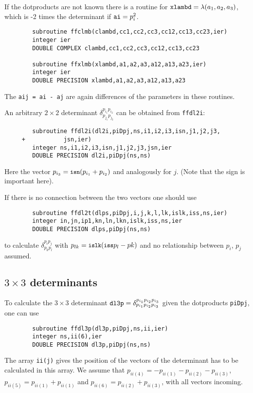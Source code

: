 If the dotproducts are not known there is a routine for $\mbox{\tt 
xlambd} = \lambda(a_1,a_2,a_3)$, which is -2 times the determinant if 
$\mbox{\tt ai} = p_i^2$.
\begin{verbatim}
        subroutine ffclmb(clambd,cc1,cc2,cc3,cc12,cc13,cc23,ier)
        integer ier
        DOUBLE COMPLEX clambd,cc1,cc2,cc3,cc12,cc13,cc23

        subroutine ffxlmb(xlambd,a1,a2,a3,a12,a13,a23,ier)
        integer ier
        DOUBLE PRECISION xlambd,a1,a2,a3,a12,a13,a23
\end{verbatim}
The {\tt aij = ai - aj} are again differences of the parameters in these 
routines.

An arbitrary $2\times2$ determinant $\delta^{p_{i_1} p_{i_2}}_{p_{j_1} 
p_{j_2}}$ can be obtained from {\tt ffdl2i}:
\begin{verbatim}
        subroutine ffdl2i(dl2i,piDpj,ns,i1,i2,i3,isn,j1,j2,j3,
     +           jsn,ier)
        integer ns,i1,i2,i3,isn,j1,j2,j3,jsn,ier
        DOUBLE PRECISION dl2i,piDpj(ns,ns)
\end{verbatim}
Here the vector $p_{i_3} = \mbox{\small\tt isn}(p_{i_1} + p_{i_2})$ and 
analogously for $j$.  (Note that the sign is important here).

If there is no connection between the two vectors one should use
\begin{verbatim}
        subroutine ffdl2t(dlps,piDpj,i,j,k,l,lk,islk,iss,ns,ier)
        integer in,jn,ip1,kn,ln,lkn,islk,iss,ns,ier
        DOUBLE PRECISION dlps,piDpj(ns,ns)
\end{verbatim}
to calculate $\delta^{p_i p_j}_{p_k p_l}$ with $p_{lk} = \mbox{\small\tt islk}
( \mbox{\small\tt iss} p_l - pk)$ and no relationship between $p_i$, $p_j$ 
assumed.

\subsection{$3\times3$ determinants}

To calculate the $3\times3$ determinant $\mbox{\tt dl3p} = 
\delta^{p_{i_1}p_{i_2}p_{i_3}}_{p_{i_1}p_{i_2}p_{i_3}}$ given the dotproducts 
{\tt piDpj}, one can use
\begin{verbatim}
        subroutine ffdl3p(dl3p,piDpj,ns,ii,ier)
        integer ns,ii(6),ier
        DOUBLE PRECISION dl3p,piDpj(ns,ns)
\end{verbatim}
The array {\tt ii(j)} gives the position of the vectors of the determinant has 
to be calculated in this array.  We assume that $p_{ii(4)} = -p_{ii(1)} 
-p_{ii(2)} -p_{ii(3)}$, $p_{ii(5)} = p_{ii(1)} + p_{ii(1)}$ and 
$p_{ii(6)} = p_{ii(2)} + p_{ii(3)}$, with all vectors incoming.

